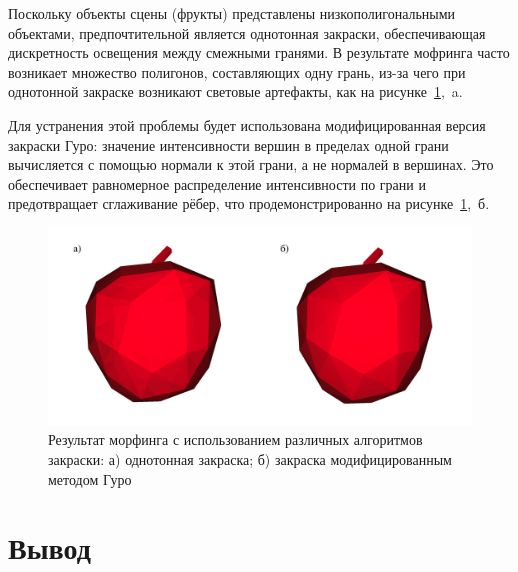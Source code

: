    Поскольку объекты сцены (фрукты) представлены низкополигональными объектами, предпочтительной является однотонная закраски, обеспечивающая дискретность освещения между смежными гранями. В результате мофринга часто возникает множество полигонов, составляющих одну грань, из-за чего при однотонной закраске возникают световые артефакты, как на рисунке~\ref{fig:gouraund_midified},~a.
    
    Для устранения этой проблемы будет использована модифицированная версия закраски Гуро: значение интенсивности вершин в пределах одной грани вычисляется с помощью нормали к этой грани, а не нормалей в вершинах. Это обеспечивает равномерное распределение интенсивности по грани и предотвращает сглаживание рёбер, что продемонстрированно на рисунке~\ref{fig:gouraund_midified},~б.
    
    \begin{figure}[H]
	    \includegraphics[width=\linewidth]{../inc/images/gouraund_modified}
	    \caption{Результат морфинга с использованием различных алгоритмов закраски: а) однотонная закраска; б) закраска модифицированным методом Гуро}
 	    \label{fig:gouraund_midified}
    \end{figure}
\section*{Вывод}

\clearpage